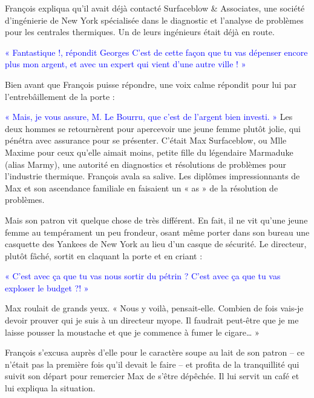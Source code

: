 François expliqua qu’il avait déjà contacté Surfaceblow \& Associates, une société d’ingénierie de New York spécialisée dans le diagnostic et l’analyse de problèmes pour les centrales thermiques. Un de leurs ingénieurs était déjà en route.
\vspace{0.3cm}

\textcolor{blue}{« Fantastique !, répondit Georges C’est de cette façon que tu vas dépenser encore plus mon argent, et avec un expert qui vient d’une autre ville ! »}
\vspace{0.3cm}

Bien avant que François puisse répondre, une voix calme répondit pour lui par l’entrebâillement de la porte : 
\vspace{0.3cm}

\textcolor{blue}{« Mais, je vous assure, M. Le Bourru, que c’est de l’argent bien investi. »}
Les deux hommes se retournèrent pour apercevoir une jeune femme plutôt jolie, qui pénétra avec assurance pour se présenter. C’était Max Surfaceblow, ou Mlle Maxime pour ceux qu’elle aimait moins, petite fille du légendaire Marmaduke (alias Marmy), une autorité en diagnostics et résolutions de problèmes pour l’industrie thermique.
François avala sa salive. Les diplômes impressionnants de Max et son ascendance familiale en faisaient un « as » de la résolution de problèmes.

 \vspace{0.3cm}

Mais son patron vit quelque chose de très différent. En fait, il ne vit qu’une jeune femme au tempérament un peu frondeur, osant même porter dans son bureau une casquette des Yankees de New York au lieu d’un casque de sécurité. Le directeur, plutôt fâché, sortit en claquant la porte et en criant :
\vspace{0.3cm}

\textcolor{blue}{« C’est avec ça que tu vas nous sortir du pétrin ? C’est avec ça que tu vas exploser le budget ?! » }
\vspace{0.3cm}

Max roulait de grands yeux. « Nous y voilà, pensait-elle. Combien de fois vais-je devoir prouver qui je suis à un directeur myope. Il faudrait peut-être que je me laisse pousser la moustache et que je commence à fumer le cigare… »
\vspace{0.3cm}

François s’excusa auprès d’elle pour le caractère soupe au lait de son patron – ce n’était pas la première fois qu’il devait le faire – et profita de la tranquillité qui suivit son départ pour remercier Max de s’être dépêchée. Il lui servit un café et lui expliqua la situation.
\vspace{0.3cm}

